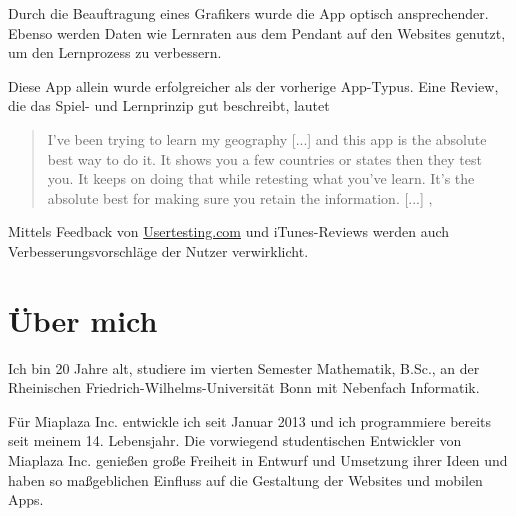 \documentclass[12pt,a4paper]{article}
\begin{document}
Durch die Beauftragung eines Grafikers wurde die App optisch ansprechender. Ebenso werden Daten wie Lernraten aus dem Pendant auf den Websites genutzt, um den Lernprozess zu verbessern.

Diese App allein wurde erfolgreicher als der vorherige App-Typus. 
Eine Review, die das Spiel- und Lernprinzip gut beschreibt, lautet \begin{quote}
 \glqq I've been trying to learn my geography [...] and this app is the absolute best way to do it. It shows you a few countries or states then they test you. It keeps on doing that while retesting what you've learn. It's the absolute best for making sure you retain the information. [...] \grqq[\ref{geotouch}], \end{quote}
 
Mittels Feedback von \url{Usertesting.com} und iTunes-Reviews werden auch Verbesserungsvorschläge der Nutzer verwirklicht.

\section*{Über mich}
Ich bin 20 Jahre alt, studiere im vierten Semester Mathematik, B.Sc., an der Rheinischen Friedrich-Wilhelms-Universität Bonn mit Nebenfach Informatik. 

Für Miaplaza Inc. entwickle ich seit Januar 2013 und ich programmiere bereits seit meinem 14. Lebensjahr. Die vorwiegend studentischen Entwickler von Miaplaza Inc. genießen große Freiheit in Entwurf und Umsetzung ihrer Ideen und haben so maßgeblichen Einfluss auf die Gestaltung der Websites und mobilen Apps.
\end{document}
